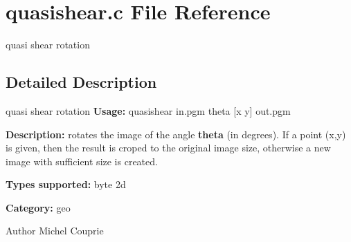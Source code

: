\section{quasishear.c File Reference}
\label{quasishear_8c}


quasi shear rotation  




\subsection{Detailed Description}
quasi shear rotation {\bfseries Usage:} quasishear in.pgm theta [x y] out.pgm

{\bfseries Description:} rotates the image of the angle {\bfseries theta} (in degrees). If a point (x,y) is given, then the result is croped to the original image size, otherwise a new image with sufficient size is created.

{\bfseries Types supported:} byte 2d

{\bfseries Category:} geo

\begin{DoxyAuthor}{Author}
Michel Couprie 
\end{DoxyAuthor}
